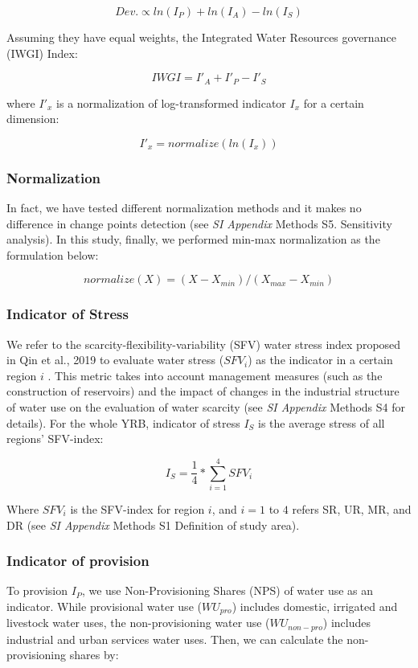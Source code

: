 \documentclass[9pt, twocolumn, twoside, lineno]{pnas-new}
\begin{document}
{	$$ Dev. \propto ln(I_P) + ln(I_A) - ln(I_S) $$

	Assuming they have equal weights, the Integrated Water Resources governance (IWGI) Index:

	$$ IWGI = I'_A + I'_P - I'_S $$

	where $I'_x$ is a normalization of log-transformed indicator $I_x$ for a certain dimension:

	$$ I'_x = normalize(ln(I_x)) $$
	
	\subsubsection*{Normalization}
	In fact, we have tested different normalization methods and it makes no difference in change points detection (see \textit{SI Appendix} Methods S5. Sensitivity analysis). In this study, finally, we performed min-max normalization as the formulation below:

	$$ normalize(X) = (X - X_{min}) / (X_{max} - X_{min}) $$

	\subsubsection*{Indicator of Stress}
	We refer to the scarcity-flexibility-variability (SFV) water stress index proposed in Qin et al., 2019 to evaluate water stress ($SFV_i$) as the indicator in a certain region $i$ \cite{qinFlexibilityIntensityGlobal2019}. This metric takes into account management measures (such as the construction of reservoirs) and the impact of changes in the industrial structure of water use on the evaluation of water scarcity (see \textit{SI Appendix} Methods S4 for details). For the whole YRB, indicator of stress $I_S$ is the average stress of all regions' SFV-index: 

	$$ I_S = \frac{1}{4} * \sum_{i=1}^4 SFV_{i} $$
	
	Where $SFV_i$ is the SFV-index for region $i$, and $i=1$ to $4$ refers SR, UR, MR, and DR (see \textit{SI Appendix} Methods S1 Definition of study area).

	\subsubsection*{Indicator of provision}
	To provision $I_P$, we use Non-Provisioning Shares (NPS) of water use as an indicator. While provisional water use ($WU_{pro}$) includes domestic, irrigated and livestock water uses, the non-provisioning water use ($WU_{non-pro}$) includes industrial and urban services water uses. Then, we can calculate the non-provisioning shares by:

}
\end{document}
